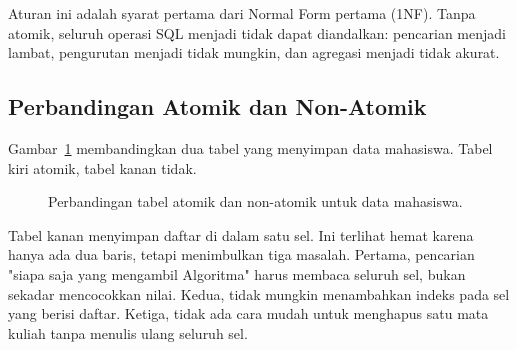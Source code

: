 \documentclass[11pt,a4paper]{article}
\begin{document}
Aturan ini adalah syarat pertama dari Normal Form pertama (1NF). Tanpa atomik, seluruh operasi SQL menjadi tidak dapat diandalkan: pencarian menjadi lambat, pengurutan menjadi tidak mungkin, dan agregasi menjadi tidak akurat.

\subsection{Perbandingan Atomik dan Non-Atomik}

Gambar~\ref{fig:atomic} membandingkan dua tabel yang menyimpan data mahasiswa. Tabel kiri atomik, tabel kanan tidak.

\begin{figure}[H]
	\centering
	\caption{Perbandingan tabel atomik dan non-atomik untuk data mahasiswa.}
	\label{fig:atomic}
\end{figure}

Tabel kanan menyimpan daftar di dalam satu sel. Ini terlihat hemat karena hanya ada dua baris, tetapi menimbulkan tiga masalah. Pertama, pencarian "siapa saja yang mengambil Algoritma" harus membaca seluruh sel, bukan sekadar mencocokkan nilai. Kedua, tidak mungkin menambahkan indeks pada sel yang berisi daftar. Ketiga, tidak ada cara mudah untuk menghapus satu mata kuliah tanpa menulis ulang seluruh sel.
\end{document}
